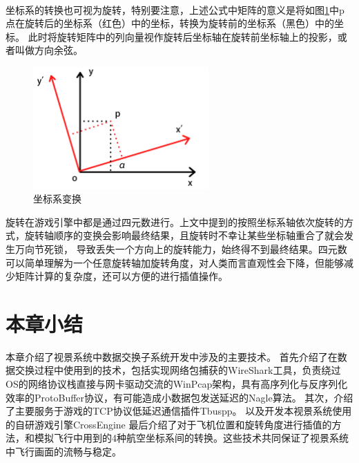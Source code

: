 ~\\
\par
坐标系的转换也可视为旋转，特别要注意，上述公式中矩阵的意义是将如图\ref{crood3}中p点在旋转后的坐标系（红色）中的坐标，转换为旋转前的坐标系（黑色）中的坐标。
此时将旋转矩阵中的列向量视作旋转后坐标轴在旋转前坐标轴上的投影，或者叫做方向余弦。

\begin{figure}[h!]
    \begin{center}
        \includegraphics[width=0.6\textwidth]{pictures/rotate.png}
        \caption{坐标系变换}
        \label{crood3}
    \end{center}
\end{figure}
\par 
旋转在游戏引擎中都是通过四元数进行。上文中提到的按照坐标系轴依次旋转的方式，旋转轴顺序的变换会影响最终结果，且旋转时不幸让某些坐标轴重合了就会发生万向节死锁，
导致丢失一个方向上的旋转能力\cite{rotate3}，始终得不到最终结果。四元数可以简单理解为一个任意旋转轴加旋转角度，对人类而言直观性会下降，但能够减少矩阵计算的复杂度，还可以方便的进行插值操作\cite{rotate2}。
\section{本章小结}
本章介绍了视景系统中数据交换子系统开发中涉及的主要技术。
首先介绍了在数据交换过程中使用到的技术，包括实现网络包捕获的WireShark工具，负责绕过OS的网络协议栈直接与网卡驱动交流的WinPcap架构，具有高序列化与反序列化效率的ProtoBuffer协议，有可能造成小数据包发送延迟的Nagle算法。
其次，介绍了主要服务于游戏的TCP协议低延迟通信插件Tbuspp。
以及开发本视景系统使用的自研游戏引擎CrossEngine
最后介绍了对于飞机位置和旋转角度进行插值的方法，和模拟飞行中用到的4种航空坐标系间的转换。这些技术共同保证了视景系统中飞行画面的流畅与稳定。
